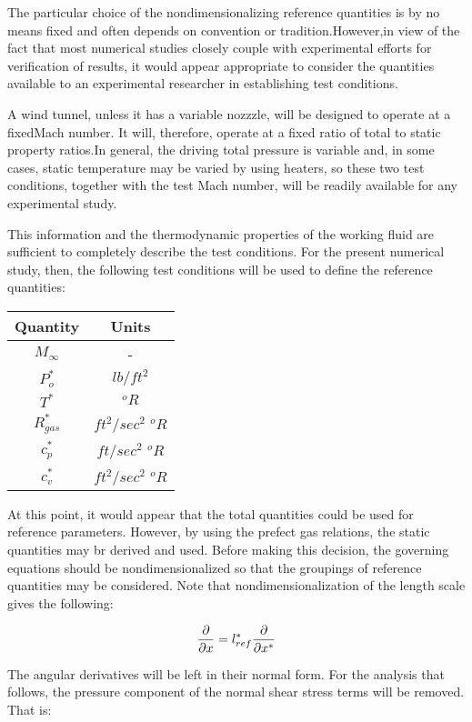 The particular choice of the nondimensionalizing reference quantities is by no
means fixed and often depends on convention or tradition.However,in view of the
fact that most numerical studies closely couple with experimental efforts for
verification of results, it would appear appropriate to consider the quantities
available to an experimental researcher in establishing test conditions.

A wind tunnel, unless it has a variable nozzzle, will be designed to operate at a fixedMach number. It will, therefore, operate at a fixed ratio of total to static property ratios.In general, the driving total pressure is variable and, in some cases, static temperature may be varied by using heaters, so these two test conditions, together with the test Mach number, will be readily available for any experimental study.

This information and the thermodynamic properties of the working fluid are sufficient to completely describe the test conditions. For the present numerical study, then, the following test conditions will be used to define the reference quantities:

\begin{center}
\begin{tabular}{ c c }
Quantity & Units \\
\hline
$M_\infty$ & - \\ 
$P^*_o$ & $lb/ft^2$ \\
$T^*$ & $^oR$ \\
$R^*_{gas}$ & $ft^2/sec^2$ $^oR$ \\
$c_p^*$ & $ft/sec^2$ $^oR$ \\
$c_v^*$ & $ft^2/sec^2$ $^oR$
\end{tabular}
\end{center}

At this point, it would appear that the total quantities could be used for reference parameters. However, by using the prefect gas relations, the static quantities may br derived and used. Before making this decision, the governing equations should be nondimensionalized so that the groupings of reference quantities may be considered. Note that nondimensionalization of the length scale gives the following:

\begin{equation}
\pdv{x} = l^*_{ref} \pdv{x^*}
\end{equation}

The angular derivatives will be left in their normal form. For the analysis that follows, the pressure component of the normal shear stress terms will be removed. That is:

